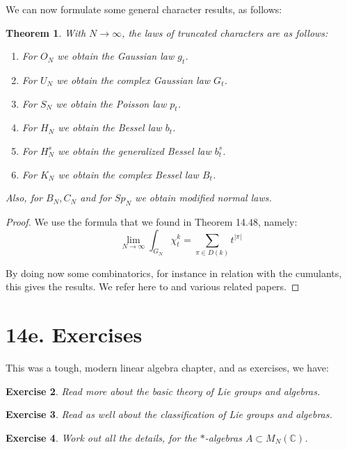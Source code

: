 \documentclass[12pt]{amsbook}
\newtheorem{theorem}{Theorem}[chapter]
\newtheorem{exercise}[theorem]{Exercise}
\begin{document}
We can now formulate some general character results, as follows:

\begin{theorem}
With $N\to\infty$, the laws of truncated characters are as follows:
\begin{enumerate}
\item For $O_N$ we obtain the Gaussian law $g_t$.

\item For $U_N$ we obtain the complex Gaussian law $G_t$.

\item For $S_N$ we obtain the Poisson law $p_t$.

\item For $H_N$ we obtain the Bessel law $b_t$.

\item For $H_N^s$ we obtain the generalized Bessel law $b_t^s$.

\item For $K_N$ we obtain the complex Bessel law $B_t$.
\end{enumerate}
Also, for $B_N,C_N$ and for $Sp_N$ we obtain modified normal laws.
\end{theorem}

\begin{proof}
We use the formula that we found in Theorem 14.48, namely:
$$\lim_{N\to\infty}\int_{G_N}\chi_t^k=\sum_{\pi\in D(k)}t^{|\pi|}$$

By doing now some combinatorics, for instance in relation with the cumulants, this gives the results. We refer here to \cite{ba1} and various related papers.
\end{proof}

\section*{14e. Exercises}

This was a tough, modern linear algebra chapter, and as exercises, we have:

\begin{exercise}
Read more about the basic theory of Lie groups and algebras.
\end{exercise}

\begin{exercise}
Read as well about the classification of Lie groups and algebras.
\end{exercise}

\begin{exercise}
Work out all the details, for the $*$-algebras $A\subset M_N(\mathbb C)$.
\end{exercise}
\end{document}
